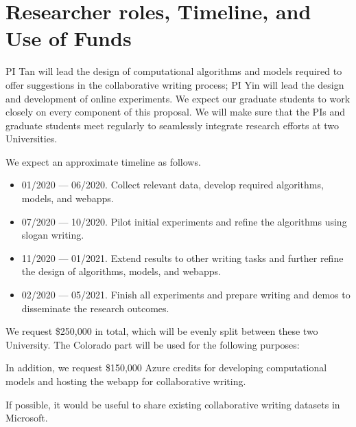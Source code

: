 
\section{Researcher roles, Timeline, and Use of Funds}

PI Tan will lead the design of computational algorithms and models required to offer suggestions in the collaborative writing process;
PI Yin will lead the design and development of online experiments.
We expect our graduate students to work closely on every component of this proposal.
We will make sure that the PIs and graduate students meet regularly to seamlessly integrate research efforts at two Universities.


 We expect an approximate timeline as follows.

\begin{itemize}
    \item 01/2020 --- 06/2020. Collect relevant data, develop required algorithms, models, and webapps.
    \item 07/2020 --- 10/2020. Pilot initial experiments and refine the algorithms using slogan writing.
    \item 11/2020 --- 01/2021. Extend results to other writing tasks and further refine the design of algorithms, models, and webapps.
    \item 02/2020 --- 05/2021. Finish all experiments and prepare writing and demos to disseminate the research outcomes.
\end{itemize}

 We request \$250,000 in total, which will be evenly split between these two University.
The Colorado part will be used for the following purposes:

In addition, we request \$150,000 Azure credits for developing computational models and hosting the webapp for collaborative writing.


 If possible, it would be useful to share existing collaborative writing datasets in Microsoft.

